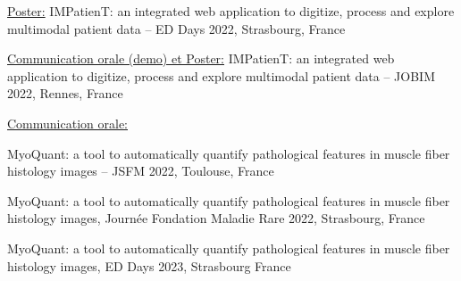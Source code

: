 \underline{Poster:} IMPatienT: an integrated web application to digitize, process and explore multimodal patient data – ED Days 2022, Strasbourg, France

\underline{Communication orale (demo) et Poster:} IMPatienT: an integrated web application to digitize, process and explore multimodal patient data – JOBIM 2022, Rennes, France

\underline{Communication orale:}

MyoQuant: a tool to automatically quantify pathological features in muscle fiber histology images – JSFM 2022, Toulouse, France

MyoQuant: a tool to automatically quantify pathological features in muscle fiber histology images, Journée Fondation Maladie Rare 2022, Strasbourg, France

MyoQuant: a tool to automatically quantify pathological features in muscle fiber histology images, ED Days 2023, Strasbourg France

